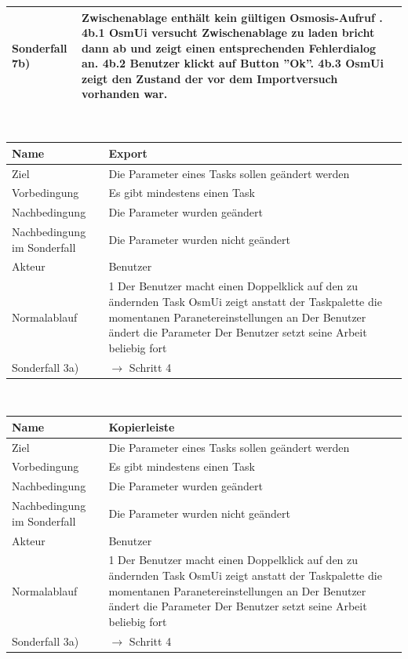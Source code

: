 \documentclass[a4paper,12pt]{scrartcl}
\begin{document}
\begin{center}
\begin{tabular}{|p{5cm}|p{10cm}|}
\hline Sonderfall 7b)& Zwischenablage enthält kein gültigen Osmosis-Aufruf .
\newline
 4b.1 OsmUi versucht Zwischenablage zu laden bricht dann ab und zeigt einen entsprechenden Fehlerdialog an.
\newline
 4b.2 Benutzer klickt auf Button ''Ok''.
\newline
 4b.3 OsmUi zeigt den Zustand der vor dem Importversuch vorhanden war.
\\
\hline 
\end{tabular} 
\vspace{0.7cm}
\\
\begin{tabular}{|p{5cm}|p{10cm}|}
\hline Name & \textbf{Export} \\ 
\hline Ziel & Die Parameter eines Tasks sollen geändert werden\\ 
\hline Vorbedingung & Es gibt mindestens einen Task\\ 
\hline Nachbedingung & Die Parameter wurden geändert \\  
\hline Nachbedingung im Sonderfall & Die Parameter wurden nicht geändert\\
\hline Akteur & Benutzer \\ 
\hline Normalablauf & 1 Der Benutzer macht einen Doppelklick auf den zu ändernden Task
\newline 2 OsmUi zeigt anstatt der Taskpalette die momentanen Paranetereinstellungen an
\newline 3 Der Benutzer ändert die Parameter
\newline 4 Der Benutzer setzt seine Arbeit beliebig fort\\ 
\hline Sonderfall 3a) & $ \rightarrow$ Schritt 4\\
\hline 
\end{tabular}
\vspace{0.7cm}
\\
\begin{tabular}{|p{5cm}|p{10cm}|}
\hline Name & \textbf{Kopierleiste} \\ 
\hline Ziel & Die Parameter eines Tasks sollen geändert werden\\ 
\hline Vorbedingung & Es gibt mindestens einen Task\\ 
\hline Nachbedingung & Die Parameter wurden geändert \\  
\hline Nachbedingung im Sonderfall & Die Parameter wurden nicht geändert\\
\hline Akteur & Benutzer \\ 
\hline Normalablauf & 1 Der Benutzer macht einen Doppelklick auf den zu ändernden Task
\newline 2 OsmUi zeigt anstatt der Taskpalette die momentanen Paranetereinstellungen an
\newline 3 Der Benutzer ändert die Parameter
\newline 4 Der Benutzer setzt seine Arbeit beliebig fort\\ 
\hline Sonderfall 3a) & $ \rightarrow$ Schritt 4\\
\hline 
\end{tabular} 

\end{center}
\end{document}
